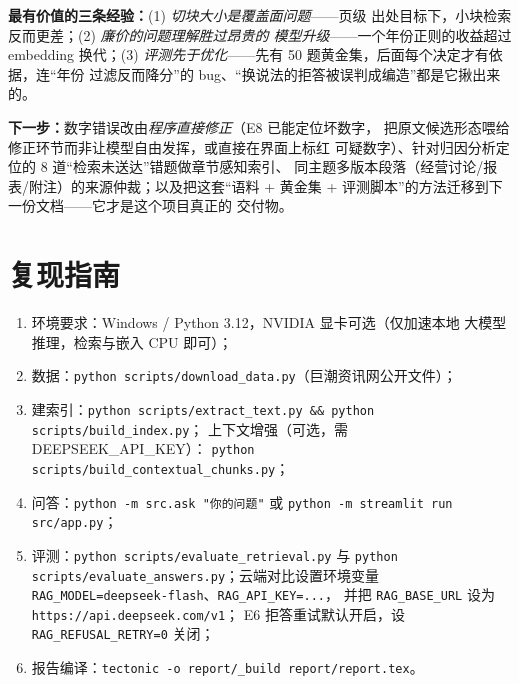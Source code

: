 \documentclass[UTF8,11pt]{ctexart}
\begin{document}
\textbf{最有价值的三条经验：}(1) \emph{切块大小是覆盖面问题}——页级
出处目标下，小块检索反而更差；(2) \emph{廉价的问题理解胜过昂贵的
模型升级}——一个年份正则的收益超过 embedding 换代；(3) \emph{
评测先于优化}——先有 50 题黄金集，后面每个决定才有依据，连``年份
过滤反而降分''的 bug、``换说法的拒答被误判成编造''都是它揪出来的。

\textbf{下一步：}数字错误改由\emph{程序直接修正}（E8 已能定位坏数字，
把原文候选形态喂给修正环节而非让模型自由发挥，或直接在界面上标红
可疑数字）、针对归因分析定位的 8 道``检索未送达''错题做章节感知索引、
同主题多版本段落（经营讨论/报表/附注）的来源仲裁；以及把这套``语料 +
黄金集 + 评测脚本''的方法迁移到下一份文档——它才是这个项目真正的
交付物。

\appendix
\section{复现指南}

\begin{enumerate}
  \item 环境要求：Windows / Python 3.12，NVIDIA 显卡可选（仅加速本地
        大模型推理，检索与嵌入 CPU 即可）；
  \item 数据：\texttt{python scripts/download\_data.py}（巨潮资讯网公开文件）；
  \item 建索引：\texttt{python scripts/extract\_text.py \&\& python scripts/build\_index.py}；
        上下文增强（可选，需 DEEPSEEK\_API\_KEY）：
        \texttt{python scripts/build\_contextual\_chunks.py}；
  \item 问答：\texttt{python -m src.ask "你的问题"} 或
        \texttt{python -m streamlit run src/app.py}；
  \item 评测：\texttt{python scripts/evaluate\_retrieval.py} 与
        \texttt{python scripts/evaluate\_answers.py}；云端对比设置环境变量
        \texttt{RAG\_MODEL=deepseek-flash}、\texttt{RAG\_API\_KEY=...}，
        并把 \texttt{RAG\_BASE\_URL} 设为 \texttt{https://api.deepseek.com/v1}；
        E6 拒答重试默认开启，设 \texttt{RAG\_REFUSAL\_RETRY=0} 关闭；
  \item 报告编译：\texttt{tectonic -o report/\_build report/report.tex}。
\end{enumerate}
\end{document}
